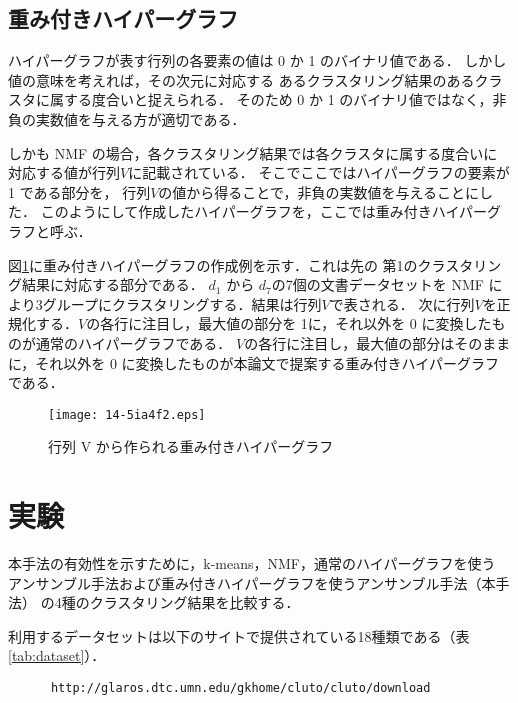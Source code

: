 \documentclass[japanese]{jnlp_1.3e}
\begin{document}
\subsection{重み付きハイパーグラフ}

ハイパーグラフが表す行列の各要素の値は 0 か 1 のバイナリ値である．
しかし値の意味を考えれば，その次元に対応する
あるクラスタリング結果のあるクラスタに属する度合いと捉えられる．
そのため 0 か 1 のバイナリ値ではなく，非負の実数値を与える方が適切である．

しかも NMF の場合，各クラスタリング結果では各クラスタに属する度合いに
対応する値が行列\( V \)に記載されている．
そこでここではハイパーグラフの要素が 1 である部分を，
行列\( V \)の値から得ることで，非負の実数値を与えることにした．
このようにして作成したハイパーグラフを，ここでは重み付きハイパーグラフと呼ぶ．

\mbox{図\ref{ensemble}}に重み付きハイパーグラフの作成例を示す．これは先の
第1のクラスタリング結果に対応する部分である．
\( d_1 \) から \( d_7 \)の7個の文書データセットを
NMF により3グループにクラスタリングする．結果は行列\( V \)で表される．
次に行列\( V \)を正規化する．\( V \)の各行に注目し，最大値の部分を 1に，それ以外を
0 に変換したものが通常のハイパーグラフである．
\( V \)の各行に注目し，最大値の部分はそのままに，それ以外を
0 に変換したものが本論文で提案する重み付きハイパーグラフである．

\begin{figure}[tbp]
\begin{center}
\texttt{[image: 14-5ia4f2.eps]}
\caption{行列 V から作られる重み付きハイパーグラフ}\label{ensemble}
\end{center}
\end{figure}



\section{実験}


本手法の有効性を示すために，k-means，NMF，通常のハイパーグラフを使う
アンサンブル手法および重み付きハイパーグラフを使うアンサンブル手法（本手法）
の4種のクラスタリング結果を比較する．

利用するデータセットは以下のサイトで提供されている18種類である（\mbox{表\ref{tab:dataset}}）．

\begin{verbatim}
      http://glaros.dtc.umn.edu/gkhome/cluto/cluto/download
\end{verbatim}
\end{document}
